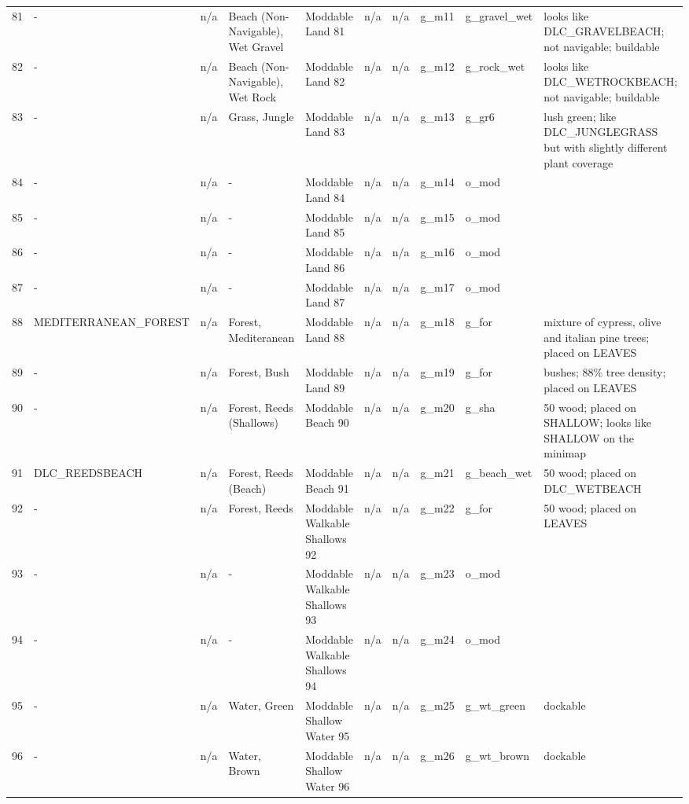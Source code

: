 \begin{landscape}
\begin{longtable}{@{}p{5mm}|p{25mm}p{23mm}|p{14mm}p{14mm}p{14mm}p{14mm}|p{10mm}p{15mm}|p{45mm}@{}}
            81	& -	& n/a	& Beach (Non-Navigable), Wet Gravel	& Moddable Land 81	& n/a	& n/a	& g\_m11	& g\_gravel\_wet		& looks like DLC\_GRAVELBEACH; not navigable; buildable \\
            82	& -	& n/a	& Beach (Non-Navigable), Wet Rock	& Moddable Land 82	& n/a	& n/a	& g\_m12	& g\_rock\_wet		& looks like DLC\_WETROCKBEACH; not navigable; buildable \\
            83	& -	& n/a	& Grass, Jungle	& Moddable Land 83	& n/a	& n/a	& g\_m13	& g\_gr6		& lush green; like DLC\_JUNGLEGRASS but with slightly different plant coverage \\
            84	& -	& n/a	& -	& Moddable Land 84	& n/a	& n/a	& g\_m14	& o\_mod		&  \\
            85	& -	& n/a	& -	& Moddable Land 85	& n/a	& n/a	& g\_m15	& o\_mod		&  \\
            86	& -	& n/a	& -	& Moddable Land 86	& n/a	& n/a	& g\_m16	& o\_mod		&  \\
            87	& -	& n/a	& -	& Moddable Land 87	& n/a	& n/a	& g\_m17	& o\_mod		&  \\
            88	& MEDITERRANEAN\_FOREST	& n/a	& Forest, Mediteranean	& Moddable Land 88	& n/a	& n/a	& g\_m18	& g\_for		& mixture of cypress, olive and italian pine trees; placed on LEAVES \\
            89	& -	& n/a	& Forest, Bush	& Moddable Land 89	& n/a	& n/a	& g\_m19	& g\_for		& bushes; 88\% tree density; placed on LEAVES \\
            90	& -	& n/a	& Forest, Reeds (Shallows)	& Moddable Beach 90	& n/a	& n/a	& g\_m20	& g\_sha		& 50 wood; placed on SHALLOW; looks like SHALLOW on the minimap \\
            91	& DLC\_REEDSBEACH	& n/a	& Forest, Reeds (Beach)	& Moddable Beach 91	& n/a	& n/a	& g\_m21	& g\_beach\_wet		& 50 wood; placed on DLC\_WETBEACH \\
            92	& -	& n/a	& Forest, Reeds	& Moddable Walkable Shallows 92	& n/a	& n/a	& g\_m22	& g\_for		& 50 wood; placed on LEAVES \\
            93	& -	& n/a	& -	& Moddable Walkable Shallows 93	& n/a	& n/a	& g\_m23	& o\_mod		&  \\
            94	& -	& n/a	& -	& Moddable Walkable Shallows 94	& n/a	& n/a	& g\_m24	& o\_mod		&  \\
            95	& -	& n/a	& Water, Green	& Moddable Shallow Water 95	& n/a	& n/a	& g\_m25	& g\_wt\_green		& dockable \\
            96	& -	& n/a	& Water, Brown	& Moddable Shallow Water 96	& n/a	& n/a	& g\_m26	& g\_wt\_brown		& dockable \\

\end{longtable}
\end{landscape}
